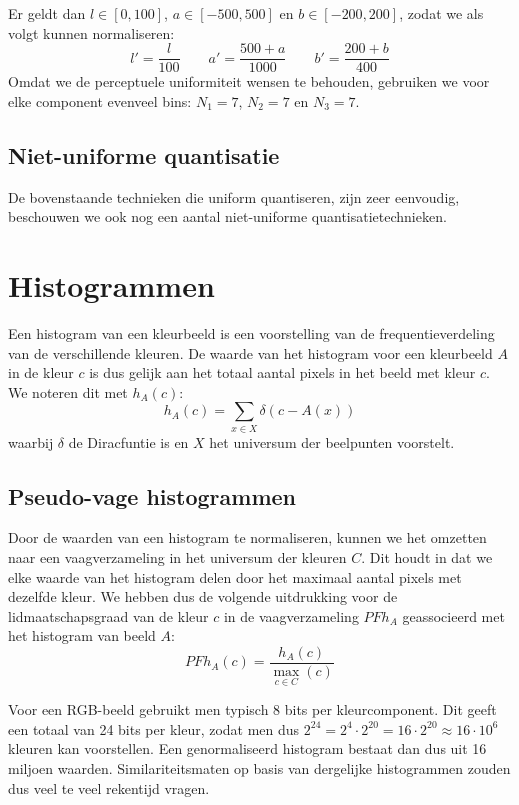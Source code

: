 Er geldt dan $l \in [0,100]$, $a \in [-500,500]$ en $b \in [-200,200]$,
zodat we als volgt kunnen normaliseren:
$$
l' = \frac{l}{100} \qquad
a' = \frac{500 + a}{1000} \qquad
b' = \frac{200 + b}{400}
$$
Omdat we de perceptuele uniformiteit wensen te behouden, gebruiken we voor elke component evenveel bins: 
$N_1=7$, $N_2=7$ en $N_3=7$.

\subsection{Niet-uniforme quantisatie}

De bovenstaande technieken die uniform quantiseren, zijn zeer eenvoudig, beschouwen we ook nog 
een aantal niet-uniforme quantisatietechnieken.
 


\section{Histogrammen}

Een histogram van een kleurbeeld is een voorstelling van de frequentieverdeling van de
verschillende kleuren. De waarde van het histogram voor een kleurbeeld $A$ in de kleur $c$ is
dus gelijk aan het totaal aantal pixels in het beeld met kleur $c$. We noteren dit met $h_A(c)$:
$$
h_A(c) = \sum_{x \in X} \delta (c - A(x))
$$
waarbij $\delta$ de Diracfuntie is en $X$ het universum der beelpunten voorstelt. 


\subsection{Pseudo-vage histogrammen}

Door de waarden van een histogram te normaliseren, kunnen we het omzetten naar een 
vaagverzameling in het universum der kleuren $C$. Dit houdt in dat we elke
waarde van het histogram delen door het maximaal aantal pixels met dezelfde kleur. 
We hebben dus de volgende uitdrukking voor de lidmaatschapsgraad van de kleur $c$ in de 
vaagverzameling $\mathit{PFh}_A$ geassocieerd met het histogram van beeld $A$:
$$
\mathit{PFh}_A(c) = \frac{\displaystyle h_A(c)}{\displaystyle \max_{c \in C}(c)}
$$

Voor een RGB-beeld gebruikt men typisch 8 bits per kleurcomponent. Dit geeft een totaal van
24 bits per kleur, zodat men dus $2^{24}=2^4 \cdot 2^{20}=16 \cdot 2^{20} \approx 16 \cdot 10^6$
kleuren kan voorstellen. Een genormaliseerd histogram bestaat dan dus uit 16 miljoen waarden.
Similariteitsmaten op basis van dergelijke histogrammen zouden dus veel te veel rekentijd vragen.

